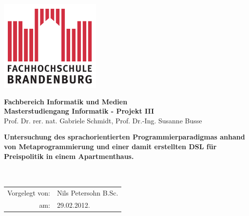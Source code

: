 \titlepage

\begin{center}
\includegraphics[width=5cm]{pics/FH-Logo}\vspace{0.5cm}

\par\end{center}

\noindent \begin{center}
\textsf{\textbf{\Large Fachbereich Informatik und Medien }}\\ 
\textsf{\textbf{\Large Masterstudiengang
Informatik - Projekt III  }}\\  
\textsf{Prof. Dr. rer. nat. Gabriele Schmidt, Prof. Dr.-Ing. Susanne Busse}\\  
\vspace{1cm}

\par\end{center}

\begin{center}
\textsf{\textbf{\huge Untersuchung des sprachorientierten
Programmierparadigmas anhand von Metaprogrammierung und einer damit
erstellten DSL für Preispolitik in einem Apartmenthaus.\\
}}\textsf{}\\ \textsf{}\

\par\end{center}{\Large \par}

\vspace{2cm}


\noindent \begin{center}
{\huge }\begin{tabular}{rl}
Vorgelegt von: & Nils Petersohn B.Sc. \tabularnewline am: &
29.02.2012.\tabularnewline
\end{tabular}
\par\end{center}{\huge \par}

